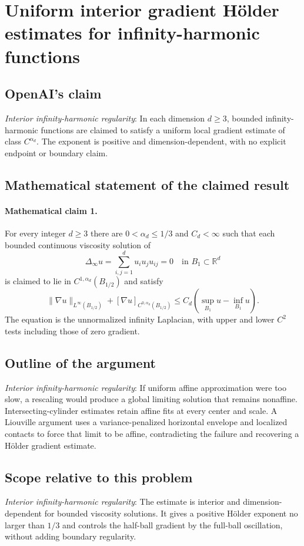 \documentclass[11pt]{article}
\begin{document}
\section*{Uniform interior gradient Hölder estimates for infinity-harmonic functions}

\subsection{OpenAI's claim}
\textit{Interior infinity-harmonic regularity}: In each dimension $d\ge3$, bounded infinity-harmonic functions are claimed to satisfy a uniform local gradient estimate of class $C^{\alpha_d}$. The exponent is positive and dimension-dependent, with no explicit endpoint or boundary claim.

\subsection{Mathematical statement of the claimed result}
\paragraph{Mathematical claim 1.} For every integer $d\ge3$ there are $0<\alpha_d\le1/3$ and $C_d<\infty$ such that each bounded continuous viscosity solution of \[\Delta_\infty u=\sum_{i,j=1}^d u_iu_ju_{ij}=0\quad\text{in }B_1\subset\mathbb R^d\] is claimed to lie in $C^{1,\alpha_d}(B_{1/2})$ and satisfy \[\|\nabla u\|_{L^\infty(B_{1/2})}+[\nabla u]_{C^{0,\alpha_d}(B_{1/2})}\le C_d(\sup_{B_1}u-\inf_{B_1}u).\] The equation is the unnormalized infinity Laplacian, with upper and lower $C^2$ tests including those of zero gradient.

\subsection{Outline of the argument}
\textit{Interior infinity-harmonic regularity}: If uniform affine approximation were too slow, a rescaling would produce a global limiting solution that remains nonaffine. Intersecting-cylinder estimates retain affine fits at every center and scale. A Liouville argument uses a variance-penalized horizontal envelope and localized contacts to force that limit to be affine, contradicting the failure and recovering a Hölder gradient estimate.

\subsection{Scope relative to this problem}
\textit{Interior infinity-harmonic regularity}: The estimate is interior and dimension-dependent for bounded viscosity solutions. It gives a positive Hölder exponent no larger than $1/3$ and controls the half-ball gradient by the full-ball oscillation, without adding boundary regularity.
\end{document}
